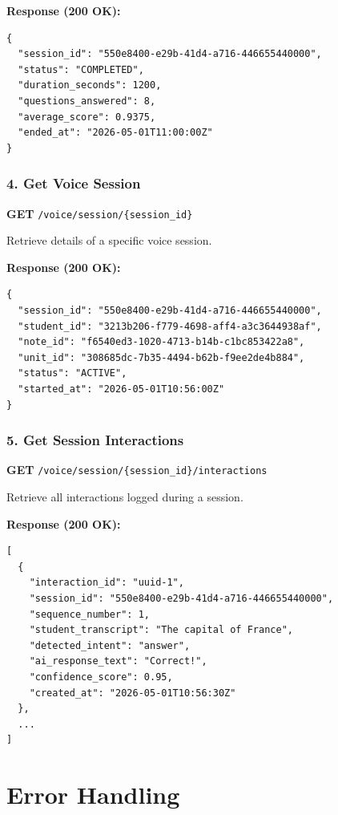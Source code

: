 \documentclass[12pt,a4paper,oneside]{article}
\begin{document}
\textbf{Response (200 OK):}
\begin{lstlisting}
{
  "session_id": "550e8400-e29b-41d4-a716-446655440000",
  "status": "COMPLETED",
  "duration_seconds": 1200,
  "questions_answered": 8,
  "average_score": 0.9375,
  "ended_at": "2026-05-01T11:00:00Z"
}
\end{lstlisting}

\subsubsection{4. Get Voice Session}

\textbf{GET} \texttt{/voice/session/\{session\_id\}}

Retrieve details of a specific voice session.

\textbf{Response (200 OK):}
\begin{lstlisting}
{
  "session_id": "550e8400-e29b-41d4-a716-446655440000",
  "student_id": "3213b206-f779-4698-aff4-a3c3644938af",
  "note_id": "f6540ed3-1020-4713-b14b-c1bc853422a8",
  "unit_id": "308685dc-7b35-4494-b62b-f9ee2de4b884",
  "status": "ACTIVE",
  "started_at": "2026-05-01T10:56:00Z"
}
\end{lstlisting}

\subsubsection{5. Get Session Interactions}

\textbf{GET} \texttt{/voice/session/\{session\_id\}/interactions}

Retrieve all interactions logged during a session.

\textbf{Response (200 OK):}
\begin{lstlisting}
[
  {
    "interaction_id": "uuid-1",
    "session_id": "550e8400-e29b-41d4-a716-446655440000",
    "sequence_number": 1,
    "student_transcript": "The capital of France",
    "detected_intent": "answer",
    "ai_response_text": "Correct!",
    "confidence_score": 0.95,
    "created_at": "2026-05-01T10:56:30Z"
  },
  ...
]
\end{lstlisting}

\section{Error Handling}
\end{document}
